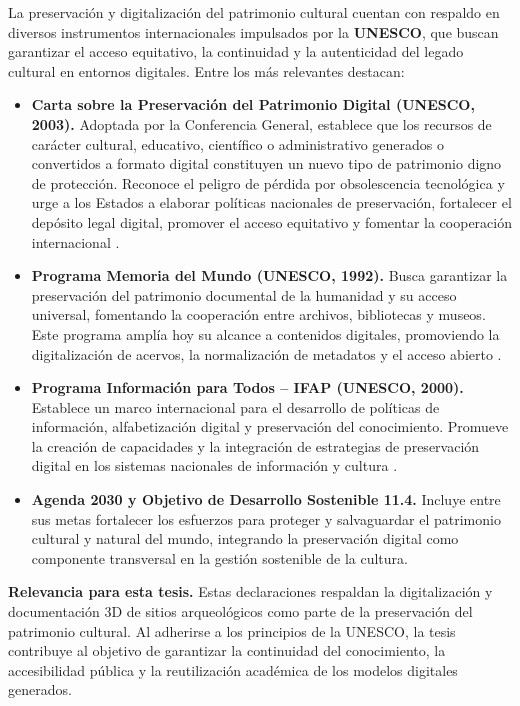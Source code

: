 La preservación y digitalización del patrimonio cultural cuentan con respaldo en diversos instrumentos internacionales impulsados por la \textbf{UNESCO}, que buscan garantizar el acceso equitativo, la continuidad y la autenticidad del legado cultural en entornos digitales. Entre los más relevantes destacan:

\begin{itemize}
  \item \textbf{Carta sobre la Preservación del Patrimonio Digital (UNESCO, 2003).} Adoptada por la Conferencia General, establece que los recursos de carácter cultural, educativo, científico o administrativo generados o convertidos a formato digital constituyen un nuevo tipo de patrimonio digno de protección. Reconoce el peligro de pérdida por obsolescencia tecnológica y urge a los Estados a elaborar políticas nacionales de preservación, fortalecer el depósito legal digital, promover el acceso equitativo y fomentar la cooperación internacional \cite{UNESCO2003Charter}.
  
  \item \textbf{Programa Memoria del Mundo (UNESCO, 1992).} Busca garantizar la preservación del patrimonio documental de la humanidad y su acceso universal, fomentando la cooperación entre archivos, bibliotecas y museos. Este programa amplía hoy su alcance a contenidos digitales, promoviendo la digitalización de acervos, la normalización de metadatos y el acceso abierto \cite{UNESCOMemoryWorld1992}.
  
  \item \textbf{Programa Información para Todos – IFAP (UNESCO, 2000).} Establece un marco internacional para el desarrollo de políticas de información, alfabetización digital y preservación del conocimiento. Promueve la creación de capacidades y la integración de estrategias de preservación digital en los sistemas nacionales de información y cultura \cite{UNESCOIFAP2000}.
  
  \item \textbf{Agenda 2030 y Objetivo de Desarrollo Sostenible 11.4.} Incluye entre sus metas fortalecer los esfuerzos para proteger y salvaguardar el patrimonio cultural y natural del mundo, integrando la preservación digital como componente transversal en la gestión sostenible de la cultura.
\end{itemize}

\textbf{Relevancia para esta tesis.} Estas declaraciones respaldan la digitalización y documentación 3D de sitios arqueológicos como parte de la preservación del patrimonio cultural. Al adherirse a los principios de la UNESCO, la tesis contribuye al objetivo de garantizar la continuidad del conocimiento, la accesibilidad pública y la reutilización académica de los modelos digitales generados.

